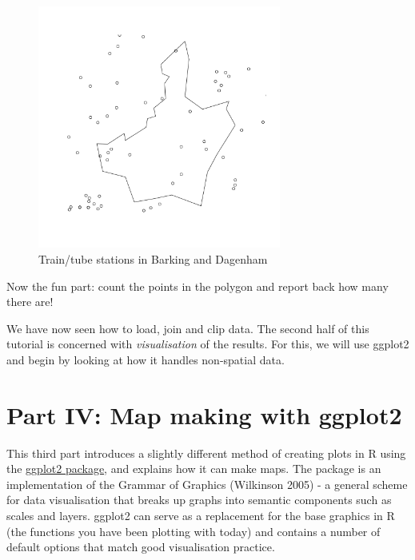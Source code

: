 \documentclass[]{article}
\newenvironment{Shaded}{}{}
\newcommand{\KeywordTok}[1]{\textcolor[rgb]{0.00,0.44,0.13}{\textbf{{#1}}}}
\newcommand{\StringTok}[1]{\textcolor[rgb]{0.25,0.44,0.63}{{#1}}}
\newcommand{\NormalTok}[1]{{#1}}
\let\Oldincludegraphics\includegraphics
\renewcommand{\includegraphics}[1]{\Oldincludegraphics[width=8cm]{#1}}
\begin{document}
\begin{Shaded}
\end{Shaded}
\begin{figure}[htbp]
\centering
\includegraphics{figure/Train/tube_stations_in_Barking_and_Dagenham.png}
\caption{Train/tube stations in Barking and Dagenham}
\end{figure}

Now the fun part: count the points in the polygon and report back how
many there are!

We have now seen how to load, join and clip data. The second half of
this tutorial is concerned with \emph{visualisation} of the results. For
this, we will use ggplot2 and begin by looking at how it handles
non-spatial data.

\section{Part IV: Map making with ggplot2}

This third part introduces a slightly different method of creating plots
in R using the \href{http://ggplot2.org/}{ggplot2 package}, and explains
how it can make maps. The package is an implementation of the Grammar of
Graphics (Wilkinson 2005) - a general scheme for data visualisation that
breaks up graphs into semantic components such as scales and layers.
ggplot2 can serve as a replacement for the base graphics in R (the
functions you have been plotting with today) and contains a number of
default options that match good visualisation practice.
\end{document}
